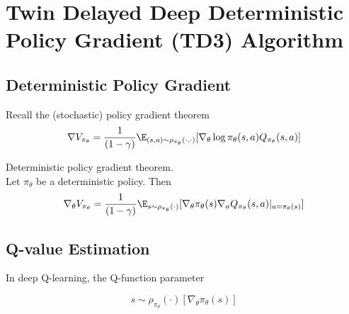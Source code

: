 \section{Twin Delayed Deep Deterministic Policy Gradient (TD3) Algorithm}
\subsection{Deterministic Policy Gradient}
Recall the (stochastic) policy gradient theorem
\[
  \nabla V_{\pi_\theta} = \frac{1}{(1-\gamma)} \E_{(s,a) \sim \rho_{\pi_\theta}(\cdot, \cdot)} [\nabla_\theta \log \pi_\theta (s,a) Q_{\pi_\theta}(s,a)]
\]
\begin{theorem}
  Deterministic policy gradient theorem. \\

  Let $\pi_\theta$ be a deterministic policy. Then
  \[
    \nabla_\theta V_{\pi_\theta} = \frac{1}{(1-\gamma)} \E_{s\sim\rho_{\pi_\theta}(\cdot)}[\nabla_\theta \pi_\theta(s) \nabla_a Q_{\pi_\theta}(s,a)|_{a = \pi_\theta(s)}]
  \]

  \subsection{Q-value Estimation}
  In deep Q-learning, the Q-function parameter
\end{theorem}

\[
  s \sim \rho_{\pi_{\theta}} (\cdot) [\nabla_\theta \pi_\theta(s)]
\]
